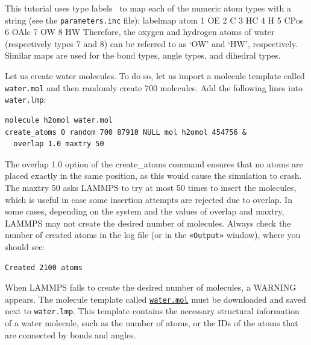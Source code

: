\documentclass[9pt,tutorial]{livecoms}
\newcommand{\lmpcmd}[1]{\hspace{0pt}\colorbox{listing}{\textcolor{command}{\small{#1}}}\hspace{0pt}} %
\newcommand{\lmpcmdnote}[1]{\hspace{0pt}\colorbox{note_listing}{\textcolor{command}{\small{#1}}}\hspace{0pt}} %
\newcommand{\flecmd}[1]{\textcolor{command}{\texttt{#1}}} %
\newcommand{\guicmd}[1]{\textcolor{command}{\texttt{«#1»}}} %
\newcommand{\dwlcmd}[1]{\textcolor{download}{\texttt{#1}}} %
\newcommand{\filepath}{https://raw.githubusercontent.com/lammpstutorials/lammpstutorials-article/main/files/}
\begin{document}
\begin{note}
This tutorial uses type labels~\cite{typelabel_paper} to map each of the
numeric atom types with a string (see the \flecmd{parameters.inc} file):
\lmpcmdnote{labelmap atom 1 OE 2 C 3 HC 4 H 5 CPos 6 OAlc 7 OW 8 HW}
Therefore, the oxygen and hydrogen atoms of water (respectively types 7 and 8)
can be referred to as `OW' and `HW', respectively.  Similar maps are used for
the bond types, angle types, and dihedral types.
\end{note}

Let us create water molecules.  To do so, let us import a molecule template called
\flecmd{water.mol} and then randomly create 700 molecules.  Add the following
lines into \flecmd{water.lmp}:
\begin{lstlisting}
molecule h2omol water.mol
create_atoms 0 random 700 87910 NULL mol h2omol 454756 &
  overlap 1.0 maxtry 50
\end{lstlisting}
The \lmpcmd{overlap 1.0} option of the \lmpcmd{create\_atoms} command ensures
that no atoms are placed exactly in the same position, as this would cause the
simulation to crash.  The \lmpcmd{maxtry 50} asks LAMMPS to try at most 50 times
to insert the molecules, which is useful in case some insertion attempts are
rejected due to overlap.  In some cases, depending on the system and the values
of \lmpcmd{overlap} and \lmpcmd{maxtry}, LAMMPS may not create the desired number
of molecules.  Always check the number of created atoms in the \lmpcmd{log} file
(or in the \guicmd{Output} window), where you should see:
\begin{lstlisting}
Created 2100 atoms
\end{lstlisting}
When LAMMPS fails to create the desired number of molecules, a WARNING appears.
The molecule template called \href{\filepath tutorial3/water.mol}{\dwlcmd{water.mol}}
must be downloaded and saved next to \flecmd{water.lmp}.  This template contains
the necessary structural information of a water molecule, such as the number of
atoms, or the IDs of the atoms that are connected by bonds and angles.
\end{document}
